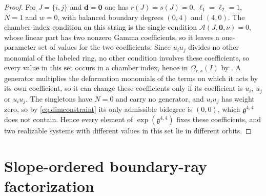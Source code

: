 \documentclass[11pt]{amsart}
\theoremstyle{definition}
\theoremstyle{remark}
\newcommand{\gfrak}{\mathfrak{g}}
\newcommand{\Ascr}{\mathcal{A}}
\newcommand{\Om}{\Omega_{r,s}}
\begin{document}
\begin{proof}
For $J=\{i,j\}$ and $\mathbf d=\mathbf 0$ one has $r(J)=s(J)=0$,
$\ell_1=\ell_2=1$, $N=1$ and $w=0$, with balanced boundary degrees $(0,4)$ and
$(4,0)$.  The chamber-index condition on this string is the single condition
$\Ascr(J,\mathbf 0,\nu)=0$, whose linear part has two nonzero Gamma
coefficients, so it
leaves a one-parameter set of values for the two coefficients.  Since
$u_iu_j$ divides no other monomial of the labeled ring, no other condition
involves these coefficients, so every value in this set occurs in a chamber index, hence
in $\Om(I)$ by \cite[Cor.~5.14]{GKT}.  A generator multiplies the deformation
monomials of the terms on which it acts by its own coefficient, so it can
change these coefficients only if its coefficient is $u_i$, $u_j$ or
$u_iu_j$.  The singletons have $N=0$ and carry no generator, and $u_iu_j$ has
weight zero, so by \eqref{eq:dimconstraint} its only admissible bidegree is
$(0,0)$, which $\gfrak^{4,4}$ does not contain.  Hence every element of
$\exp(\gfrak^{4,4})$ fixes these coefficients, and two realizable systems with
different values in this set lie in different orbits.
\end{proof}

\section{Slope-ordered boundary-ray factorization}
\label{sec:presentation}
\end{document}
